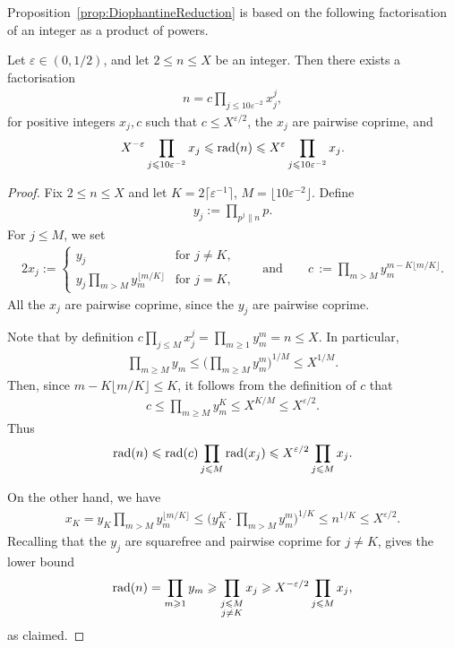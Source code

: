 Proposition~\ref{prop:DiophantineReduction} is based on the following factorisation of an integer as a product of powers.


\begin{lemma}\label{le_factor} Let $\varepsilon\in (0,1/2)$, and let $2\leq n\leq X$ be an integer. Then there exists a factorisation
\begin{align*}
n=c\prod_{j\leq 10\varepsilon^{-2}}x_j^{j},
\end{align*}
for positive integers $x_j,c$ such that $c\leq X^{\varepsilon/2}$, the $x_j$ are pairwise coprime, and \begin{align*}
X^{-\varepsilon}\prod_{j\leqslant 10\varepsilon^{-2}}x_j \leqslant \operatorname{rad}(n) \leqslant X^{\varepsilon}\prod_{j\leqslant 10\varepsilon^{-2}}x_j.
\end{align*}
\end{lemma}

\begin{proof} Fix $2\le n\le X$ and let $K=2\lceil \varepsilon^{-1}\rceil$, $M=\lfloor 10\varepsilon^{-2}\rfloor$. Define
\begin{align*}
y_j:=\prod_{p^j\|n} p.
\end{align*}
For $j\leq M$, we set
\begin{alignat*}{2}
x_j:=\begin{cases}y_j & \text{for $j\neq K$},\\
y_j\prod_{m>M}y_m^{\lfloor m/K\rfloor} & \text{for $j=K$},
\end{cases}\qquad\text{and}\qquad
c\,:=\prod_{m>M}y_m^{m-K\lfloor m/K\rfloor}.
\end{alignat*}
All the $x_j$ are pairwise coprime, since the $y_j$ are pairwise coprime.


Note that by definition $c\prod_{j\leq M}x_j^j=\prod_{m\geq 1}y_m^m=n\leq X$. In particular,
\begin{align*}
\prod_{m\geq M}y_m\leq \Big(\prod_{m\geq M}y_m^{m}\Big)^{1/M}\leq X^{1/M}.
\end{align*}
Then, since $m-K\lfloor m/K\rfloor \le K$, it follows from the definition of $c$ that
\begin{align*}
c\leq \prod_{m\geq M}y_m^K\leq X^{K/M}\leq X^{\varepsilon/2}.
\end{align*}
Thus
\[
\operatorname{rad}(n)\leqslant \operatorname{rad}(c)\prod_{j\leqslant M}\operatorname{rad}(x_j)\leqslant X^{\varepsilon/2} \prod_{j\leqslant M} x_j.
\]

On the other hand, we have
\begin{align*}
x_K = y_K\prod_{m> M}y_m^{\lfloor m/K\rfloor}\leq \Big(y_K^K\cdot\prod_{m> M}y_m^m\Big)^{1/K}\leq n^{1/K}\leq X^{\varepsilon/2}.
\end{align*}
Recalling that the $y_j$ are squarefree and pairwise coprime for $j\neq K$, gives the lower bound
\[
\operatorname{rad}(n)=\prod_{m\geqslant 1}y_m \geqslant \prod_{\substack{j\leqslant M\\j\neq K}}x_j\geqslant X^{-\varepsilon/2}\prod_{j\leqslant M}x_j,
\]
as claimed.
\end{proof}


